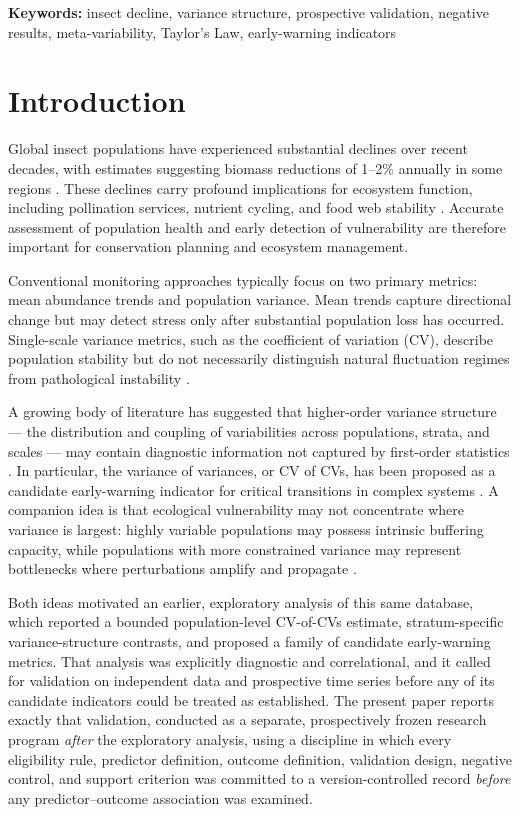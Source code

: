 \documentclass[11pt]{article}
\begin{document}
\noindent\textbf{Keywords:} insect decline, variance structure, prospective
validation, negative results, meta-variability, Taylor's Law, early-warning
indicators

\section{Introduction}

Global insect populations have experienced substantial declines over
recent decades, with estimates suggesting biomass reductions of 1--2\%
annually in some regions \citep{hallmann2017,vanklink2020a}. These
declines carry profound implications for ecosystem function, including
pollination services, nutrient cycling, and food web stability
\citep{potts2010,yang2014}. Accurate assessment of population health and
early detection of vulnerability are therefore important for conservation
planning and ecosystem management.

Conventional monitoring approaches typically focus on two primary
metrics: mean abundance trends and population variance. Mean trends
capture directional change but may detect stress only after substantial
population loss has occurred. Single-scale variance metrics, such as the
coefficient of variation (CV), describe population stability but do not
necessarily distinguish natural fluctuation regimes from pathological
instability \citep{inchausti2002,houlahan2007}.

A growing body of literature has suggested that higher-order variance
structure --- the distribution and coupling of variabilities across
populations, strata, and scales --- may contain diagnostic information
not captured by first-order statistics \citep{carpenter2006,scheffer2009}.
In particular, the variance of variances, or CV of CVs, has been proposed
as a candidate early-warning indicator for critical transitions in
complex systems \citep{dakos2012}. A companion idea is that ecological
vulnerability may not concentrate where variance is largest: highly
variable populations may possess intrinsic buffering capacity, while
populations with more constrained variance may represent bottlenecks
where perturbations amplify and propagate \citep{ives1999,tilman1999}.

Both ideas motivated an earlier, exploratory analysis of this same
database, which reported a bounded population-level CV-of-CVs estimate,
stratum-specific variance-structure contrasts, and proposed a family of
candidate early-warning metrics. That analysis was explicitly diagnostic
and correlational, and it called for validation on independent data and
prospective time series before any of its candidate indicators could be
treated as established. The present paper reports exactly that
validation, conducted as a separate, prospectively frozen research
program \emph{after} the exploratory analysis, using a discipline in
which every eligibility rule, predictor definition, outcome definition,
validation design, negative control, and support criterion was committed
to a version-controlled record \emph{before} any predictor--outcome
association was examined.
\end{document}
